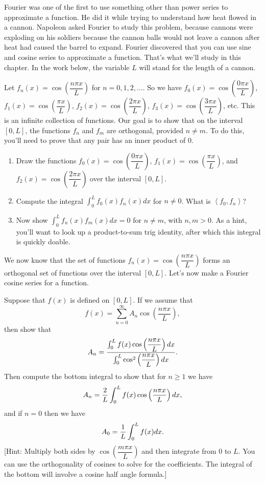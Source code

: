 Fourier was one of the first to use something other than power series to approximate a function. He did it while trying to understand how heat flowed in a cannon.  Napoleon asked Fourier to study this problem, because cannons were exploding on his soldiers because the cannon balls would not leave a cannon after heat had caused the barrel to expand. Fourier discovered that you can use sine and cosine series to approximate a function.  That's what we'll study in this chapter.  In the work below, the variable $L$ will stand for the length of a cannon.  

\begin{problem}
 Let $f_n(x) = \cos\left(\dfrac{n\pi x}{L}\right)$ for $n=0,1,2, \ldots$.  So we have $f_0(x) = \cos\left(\dfrac{0\pi x}{L}\right)$, $f_1(x) = \cos\left(\dfrac{\pi x}{L}\right)$, $f_2(x) = \cos\left(\dfrac{2\pi x}{L}\right)$, $f_3(x) = \cos\left(\dfrac{3\pi x}{L}\right)$, etc.  This is an infinite collection of functions. Our goal is to show that on the interval $[0,L]$, the functions $f_n$ and $f_m$ are orthogonal, provided $n\neq m$. To do this, you'll need to prove that any pair has an inner product of 0. 
\begin{enumerate}
 \item Draw the functions $f_0(x) = \cos\left(\dfrac{0\pi x}{L}\right)$, $f_1(x) = \cos\left(\dfrac{\pi x}{L}\right)$, and $f_2(x) = \cos\left(\dfrac{2\pi x}{L}\right)$ over the interval $[0,L]$.
 \item Compute the integral $\int_0^L f_0(x) f_n(x)dx$ for $n\neq 0$.  What is $\left<f_0,f_n\right>$?
 \item Now show $\int_0^L f_n(x) f_m(x)dx=0$ for $n\neq m$, with $n,m>0$. As a hint, you'll want to look up a product-to-sum trig identity, after which this integral is quickly doable. 
\end{enumerate}
\end{problem}

 We now know that the set of functions $f_n(x) = \cos\left(\dfrac{n\pi x}{L}\right)$ forms an orthogonal set of functions over the interval $[0,L]$. Let's now make a Fourier cosine series for a function.

\begin{problem}
 Suppose that $f(x)$ is defined on $[0,L]$. If we assume that $$f(x) = \sum_{n=0}^\infty A_n\cos\left(\dfrac{n\pi x}{L}\right),$$ 
 then show that 
$$A_n = \displaystyle\frac{\int_0^Lf(x)\cos\left(\dfrac{n\pi x}{L}\right)dx}{\int_0^L\cos^2\left(\dfrac{n\pi x}{L}\right)dx}.$$ 
 Then compute the bottom integral to show that for $n\geq 1$ we have 
$$A_n = \displaystyle\frac{2}{L}\int_0^Lf(x)\cos\left(\dfrac{n\pi x}{L}\right)dx,$$
and if $n=0$ then we have 
$$A_0 = \displaystyle\frac{1}{L}\int_0^Lf(x)dx.$$
 [Hint:  Multiply both sides by $\cos\left(\dfrac{m\pi x}{L}\right)$ and then integrate from $0$ to $L$.  You can use the orthogonality of cosines to solve for the coefficients. The integral of the bottom will involve a cosine half angle formula.]
\end{problem}

